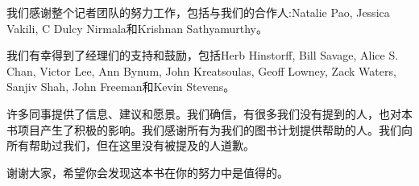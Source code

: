 我们感谢整个记者团队的努力工作，包括与我们的合作人:Natalie Pao, Jessica Vakili, C Dulcy Nirmala和Krishnan Sathyamurthy。\par

我们有幸得到了经理们的支持和鼓励，包括Herb Hinstorff, Bill Savage, Alice S. Chan, Victor Lee, Ann Bynum, John Kreatsoulas, Geoff Lowney, Zack Waters, Sanjiv Shah, John Freeman和Kevin Stevens。\par

许多同事提供了信息、建议和愿景。我们确信，有很多我们没有提到的人，也对本书项目产生了积极的影响。我们感谢所有为我们的图书计划提供帮助的人。我们向所有帮助过我们，但在这里没有被提及的人道歉。\par

谢谢大家，希望你会发现这本书在你的努力中是值得的。\par

\newpage